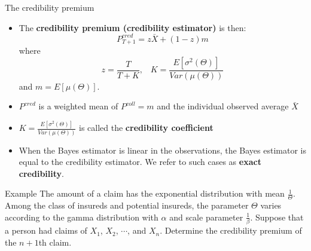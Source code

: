 \documentclass[11pt]{beamer}
\begin{document}
\begin{frame}{The credibility premium}

\begin{itemize}
\item The \textbf{credibility premium (credibility estimator)} is then:
    \begin{equation}P_{T+1}^{cred}=z\bar{X} + (1-z)m\end{equation}
    where $$z=\frac{T}{T+K}, \;\;\;K=\frac{E[\sigma^2(\Theta)]}{Var(\mu(\Theta))}$$
and
 $m=E[\mu(\Theta)].$

\item $P^{cred}$ is a weighted mean of $P^{coll}=m$ and the individual observed average $\bar{X}$

\item $K=\frac{E[\sigma^2(\Theta)]}{Var(\mu(\Theta))}$ is called the \textbf{credibility coefficient}
  
\item When the Bayes estimator is linear in the observations, the Bayes estimator is equal to the credibility estimator. We refer to such cases as \textbf{exact credibility}.

\end{itemize}

\end{frame}
\begin{frame}{Example}
\vspace{- 3 cm}
The amount of a claim has the exponential distribution with mean $\frac1{\Theta}$. Among the class of insureds and potential insureds, the parameter $\Theta$ varies according to the gamma distribution  with $\alpha$ and scale parameter $\frac1\beta$.  Suppose that a person had claims of $X_1$, $X_2$, $\cdots$, and $X_n$. Determine the credibility premium of the $n+1$th claim.\\


\end{frame}
\begin{frame}

\end{frame}
\begin{frame}

\end{frame}
\end{document}
